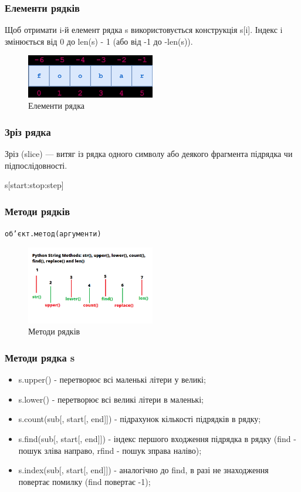 \begin{frame}
\frametitle{Елементи рядків}
Щоб отримати  i-й елемент рядка s використовується конструкція s[i]. Індекс i змінюється від 0 до len(s) - 1 (або від -1 до -len(s)).
\begin{figure}
\begin{center}
 \includegraphics[width=0.5\textwidth]{pictures/string.png}
\caption{Елементи рядка}
\label{string} 
\end{center}
\end{figure}
\end{frame}

\begin{frame}
\frametitle{Зріз рядка}
Зріз (slice) — витяг із рядка одного символу або деякого фрагмента підрядка чи підпослідовності.

\begin{center}
\LARGE{s[start:stop:step]}
\end{center}
\end{frame}

\begin{frame}
\frametitle{Методи рядків}
\begin{center}
\texttt{об'єкт.метод(аргументи)}
\end{center}
\begin{figure}
\begin{center}
 \includegraphics[width=0.5\textwidth]{pictures/python-string-methods.png}
\caption{Методи рядків}
\label{python-string-methods} 
\end{center}
\end{figure}
\end{frame}

\begin{frame}
\frametitle{Методи рядка s}
\begin{itemize}
  \item s.upper() - перетворює всі маленькі літери у великі;
  \item s.lower() - перетворює всі великі літери в маленькі;
  \item s.count(sub[, start[, end]]) - підрахунок кількості підрядків в рядку;
  \item s.find(sub[, start[, end]]) - індекс першого входження підрядка в рядку (find - пошук зліва направо, rfind - пошук зправа наліво);
  \item s.index(sub[, start[, end]]) - аналогічно до find, в разі не знаходження повертає помилку (find повертає -1);
\end{itemize}
\end{frame}

